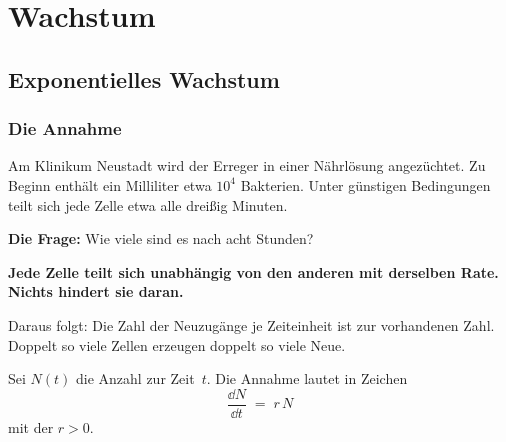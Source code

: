 \part{Wachstum}

\chapter{Exponentielles Wachstum}

\section{Die Annahme}

\begin{merksatz}
Am Klinikum Neustadt wird der Erreger in einer Nährlösung angezüchtet. Zu Beginn enthält ein Milliliter etwa $10^4$ Bakterien. Unter günstigen Bedingungen teilt sich jede Zelle etwa alle dreißig Minuten.

\textbf{Die Frage:} Wie viele sind es nach acht Stunden?
\end{merksatz}

\begin{merksatz}
\begin{center}
\begin{minipage}{0.9\textwidth}
\textbf{Jede Zelle teilt sich unabhängig von den anderen mit derselben Rate. Nichts hindert sie daran.}
\end{minipage}
\end{center}

Daraus folgt: Die Zahl der Neuzugänge je Zeiteinheit ist  zur vorhandenen Zahl. Doppelt so viele Zellen erzeugen doppelt so viele Neue.

\begin{center}
\begin{minipage}{0.88\textwidth}
\end{minipage}
\end{center}
\end{merksatz}

\begin{definition}
Sei $N(t)$ die Anzahl zur Zeit~$t$. Die Annahme lautet in Zeichen
\[ \frac{\dd N}{\dd t} \;=\; r\,N \]
mit der  $r > 0$.
\end{definition}

